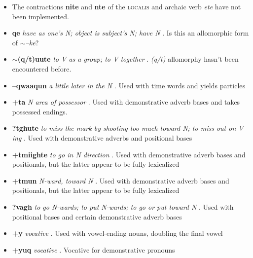 \documentclass{article}
\begin{document}
\begin{itemize}
\item The contractions \textbf{nite} and \textbf{nte} of the \textsc{localis} and archaic verb \textit{ete} have not been implemented.

\item \textbf{qe} \textit{have as one's N; object is subject's N; have N} . Is this an allomorphic form of \textit{$\sim$--ke}?

\item \textbf{$\sim$(q/t)uute} \textit{to V as a group; to V together} . \textit{(q/t)} allomorphy hasn't been encountered before.

\item \textbf{--qwaaqun} \textit{a little later in the N} . 
Used with time words and yields particles

\item \textbf{+ta} \textit{N area of possessor} . Used with demonstrative adverb bases and takes possessed endings.

\item \textbf{?tghute} \textit{to miss the mark by shooting too much toward N; to miss out on V-ing} . Used with demonstrative adverbs and positional bases

\item \textbf{+tmiighte} \textit{to go in N direction} . Used with demonstrative adverb bases and positionals, but the latter appear to be fully lexicalized

\item \textbf{+tmun} \textit{N-ward, toward N} .  Used with demonstrative adverb bases and positionals, but the latter appear to be fully lexicalized

\item \textbf{?vagh} \textit{to go N-wards; to put N-wards; to go or put toward N} . Used with positional bases and certain demonstrative adverb bases

\item \textbf{+y} \textit{vocative} . Used with vowel-ending nouns, doubling the final vowel

\item \textbf{+yuq} \textit{vocative} . Vocative for demonstrative pronouns
\end{itemize}

\pagebreak

\end{document}
